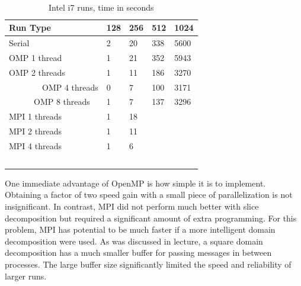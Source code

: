 \documentclass{article}
\begin{document}
  \begin{table}[hb]
    \centering
    \begin{tabular}{|l|l|l|l|l|}
      \hline
        Run Type      & 128 & 256 & 512 & 1024 \\ \hline
        Serial        & 2   & 20  & 338 & 5600 \\ 
        OMP 1 thread  & 1   & 21  & 352 & 5943 \\ 
        OMP 2 threads & 1   & 11  & 186 & 3270 \\ 
        OMP 4 threads & 0   & 7   & 100 & 3171 \\ 
        OMP 8 threads & 1   & 7   & 137 & 3296 \\
        MPI 1 threads & 1   & 18  & ~   & ~    \\
        MPI 2 threads & 1   & 11  & ~   & ~    \\
        MPI 4 threads & 1   & 6   & ~   & ~    \\  
      \hline
    \end{tabular}
      \caption{ Intel i7 runs, time in seconds} \label{fedora}
    \end{table}

    One immediate advantage of OpenMP is how simple it is to implement. 
    Obtaining a factor of two speed gain with a small piece of parallelization is not insignificant. 
    In contrast, MPI did not perform much better with slice decomposition but required a significant amount of extra programming. 
    For this problem, MPI has potential to be much faster if a more intelligent domain decomposition were used. 
    As was discussed in lecture, a square domain decomposition has a much smaller buffer for passing messages in between processes. 
    The large buffer size significantly limited the speed and reliability of larger runs. 
    
    
\end{document}
